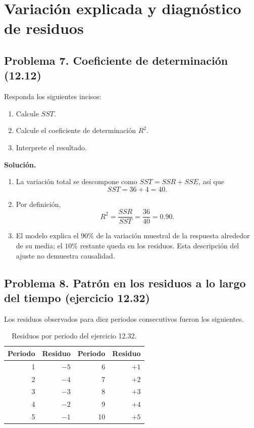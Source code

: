 \section{Variación explicada y diagnóstico de residuos}

\subsection{Problema 7. Coeficiente de determinación (12.12)}

Responda los siguientes incisos:
\begin{enumerate}
    \item[\textbf{a)}] Calcule $SST$.
    \item[\textbf{b)}] Calcule el coeficiente de determinación $R^2$.
    \item[\textbf{c)}] Interprete el resultado.
\end{enumerate}

\textbf{Solución.}
\begin{enumerate}
    \item[\textbf{a)}] La variación total se descompone como $SST=SSR+SSE$, así que
    \[
    SST=36+4=40.
    \]
    \item[\textbf{b)}] Por definición,
    \[
    R^2=\frac{SSR}{SST}=\frac{36}{40}=0.90.
    \]
    \item[\textbf{c)}] El modelo explica el $90\%$ de la variación muestral de la respuesta alrededor de su media; el $10\%$ restante queda en los residuos. Esta descripción del ajuste no demuestra causalidad.
\end{enumerate}

\clearpage
\subsection{Problema 8. Patrón en los residuos a lo largo del tiempo (ejercicio 12.32)}

Los residuos observados para diez periodos consecutivos fueron los siguientes.

\begin{table}[H]
\centering
\begin{tabular}{r|r@{\qquad\qquad}r|r}
Periodo & Residuo & Periodo & Residuo \\ \hline
1 & $-5$ & 6 & $+1$ \\
2 & $-4$ & 7 & $+2$ \\
3 & $-3$ & 8 & $+3$ \\
4 & $-2$ & 9 & $+4$ \\
5 & $-1$ & 10 & $+5$ \\
\end{tabular}
\caption{Residuos por periodo del ejercicio 12.32.}
\end{table}

